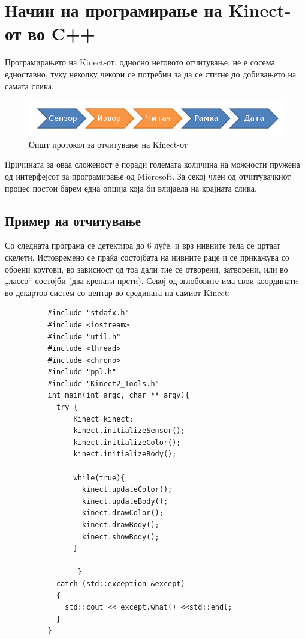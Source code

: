 \documentclass[12pt]{article}
\begin{document}
\newpage

\section{Начин на програмирање на Kinect-от во C++}
\label{sec:example}
  Програмирањето на Kinect-от, односно неговото отчитување, не е сосема едноставно, туку неколку чекори се потребни за да се стигне до добивањето на самата слика.

  \begin{figure}[H]
    \includegraphics[width=0.75\linewidth]{./images/programming_flow_trimmed.png}
    \centering
    \caption{Општ протокол за отчитување на Kinect-от}
    \label{fig:programming_flow_trimmed.png}
    \end{figure}

  Причината за оваа сложеност е поради големата количина на можности пружена од интерфејсот за програмирање од Microsoft. За секој член од отчитувачкиот процес постои барем една опција која би влијаела на крајната слика.

  \subsection{Пример на отчитување}
    Со следната програма се детектира до 6 луѓе, и врз нивните тела се цртаат скелети. Истовремено се праќа состојбата на нивните раце и се прикажува со обоени кругови, во зависност од тоа дали тие се отворени, затворени, или во „лассо“ состојби (два кренати прсти). Секој од зглобовите има свои координати во декартов систем со центар во средината на самиот Kinect:
      \begin{verbatim}
          #include "stdafx.h"
          #include <iostream>
          #include "util.h"
          #include <thread>
          #include <chrono>
          #include "ppl.h"
          #include "Kinect2_Tools.h"
          int main(int argc, char ** argv){
            try {
                Kinect kinect;
                kinect.initializeSensor();
                kinect.initializeColor();
                kinect.initializeBody();

                while(true){
                  kinect.updateColor();
                  kinect.updateBody();
                  kinect.drawColor();
                  kinect.drawBody();
                  kinect.showBody();
                }

                 }
            catch (std::exception &except)
            {
              std::cout << except.what() <<std::endl;
            }
          }
        \end{verbatim}
\end{document}
